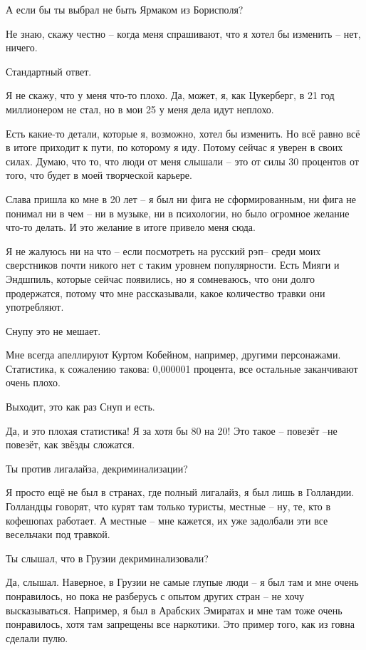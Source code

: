 А если бы ты выбрал не быть Ярмаком из Борисполя?

Не знаю, скажу честно – когда меня спрашивают, что я хотел бы изменить – нет,
ничего.

Стандартный ответ.

Я не скажу, что у меня что-то плохо. Да, может, я, как Цукерберг, в 21 год
миллионером не стал, но в мои 25 у меня дела идут неплохо.

Есть какие-то детали, которые я, возможно, хотел бы изменить. Но всё равно всё
в итоге приходит к пути, по которому я иду. Потому сейчас я уверен в своих
силах. Думаю, что то, что люди от меня слышали – это от силы 30 процентов от
того, что будет в моей творческой карьере.

Слава пришла ко мне в 20 лет – я был ни фига  не сформированным, ни фига не
понимал ни в чем – ни в музыке, ни в психологии, но было огромное желание
что-то делать. И это желание в итоге привело меня сюда.

Я не жалуюсь ни на что – если посмотреть на русский рэп– среди моих сверстников
почти никого нет с таким уровнем популярности. Есть Мияги и Эндшпиль, которые
сейчас появились, но я сомневаюсь, что они долго продержатся, потому что мне
рассказывали, какое количество травки они употребляют.

Снупу это не мешает.

Мне всегда апеллируют Куртом Кобейном, например, другими персонажами.
Статистика, к сожалению такова: 0,000001 процента, все остальные заканчивают
очень плохо.

Выходит, это как раз Снуп и есть.

Да, и это плохая статистика! Я за хотя бы 80 на 20! Это такое – повезёт –не
повезёт, как звёзды сложатся.

Ты против лигалайза, декриминализации?

Я просто ещё не был в странах, где полный лигалайз, я был лишь в Голландии.
Голландцы говорят, что курят там только туристы, местные – ну, те, кто в
кофешопах работает. А местные – мне кажется, их уже задолбали эти все
весельчаки под травкой.

Ты слышал, что в Грузии декриминализовали?

Да, слышал. Наверное, в Грузии не самые глупые люди – я был там и мне очень
понравилось, но пока не разберусь с опытом других стран – не хочу
высказываться. Например, я был в Арабских Эмиратах и мне там тоже очень
понравилось, хотя там запрещены все наркотики. Это пример того, как из говна
сделали пулю.

